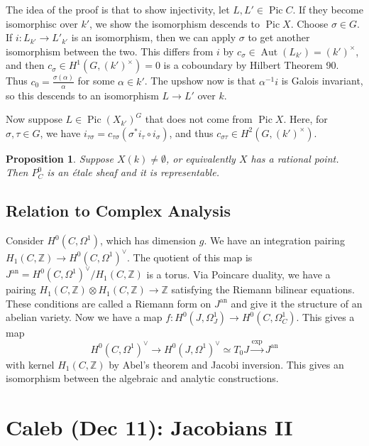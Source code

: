 \documentclass[leqno, openany]{memoir}
\newtheorem{prop}[thm]{Proposition}
\theoremstyle{definition}
\theoremstyle{remark}
\theoremstyle{plain}
\theoremstyle{definition}
\theoremstyle{remark}
\newcommand{\Z}{\mathbb{Z}}
\newcommand{\mr}[1]{\mathrm{#1}}
\DeclareMathOperator{\Aut}{Aut}
\DeclareMathOperator{\Pic}{Pic}
\begin{document}
The idea of the proof is that to show injectivity, let $L, L' \in \Pic C$. If they become isomorphisc over $k'$, we show the isomorphism descends to $\Pic X$. Choose $\sigma \in G$. If $i \colon L_{k'} \to L'_{k'}$ is an isomorphism, then we can apply $\sigma$ to get another isomorphism between the two. This differs from $i$ by $c_{\sigma} \in \Aut(L_{k'}) = (k')^{\times}$, and then $c_{\sigma} \in H^1(G, (k')^{\times}) = 0$ is a coboundary by Hilbert Theorem 90. Thus $c_0 = \frac{\sigma(\alpha)}{\alpha}$ for some $\alpha \in k'$. The upshow now is that $\alpha^{-1} i$ is Galois invariant, so this descends to an isomorphism $L \to L'$ over $k$.

Now suppose $L \in \Pic {(X_{k'})}^G$ that does not come from $\Pic X$. Here, for $\sigma, \tau \in G$, we have $i_{\tau\sigma} = c_{\tau\sigma} (\sigma^*i_{\tau} \circ i_{\sigma})$, and thus $c_{\sigma \tau} \in H^2(G, {(k')}^{\times})$.

\begin{prop}
    Suppose $X(k) \neq \emptyset$, or equivalently $X$ has a rational point. Then $P_C^0$ is an \'etale sheaf and it is representable.
\end{prop}

\section{Relation to Complex Analysis}%
\label{sec:relation_to_complex_analysis}

Consider $H^0(C, \Omega^1)$, which has dimension $g$. We have an integration pairing $H_1(C, \Z) \to {H^0(C, \Omega^1)}^{\vee}$. The quotient of this map is $J^{\mr{an}} = {H^0(C, \Omega^1)}^{\vee} / H_1(C, \Z)$ is a torus. Via Poincare duality, we have a pairing $H_1(C, \Z) \otimes H_1(C, \Z) \to \Z$ satisfying the Riemann bilinear equations. These conditions are called a Riemann form on $J^{\mr{an}}$ and give it the structure of an abelian variety. Now we have a map $f \colon H^0(J, \Omega^1_J) \to H^0(C, \Omega^1_C)$. This gives a map
\[ {H^0(C, \Omega^1)}^{\vee} \to {H^0(J, \Omega^1)}^{\vee} \simeq T_0 J \xrightarrow{\mr{exp}} J^{\mr{an}} \]
with kernel $H_1(C, \Z)$ by Abel's theorem and Jacobi inversion. This gives an isomorphism between the algebraic and analytic constructions.

\chapter{Caleb (Dec 11): Jacobians II}%
\label{cha:caleb_dec_11_jacobians_ii_and_the_history_of_armwrestling}
\end{document}
